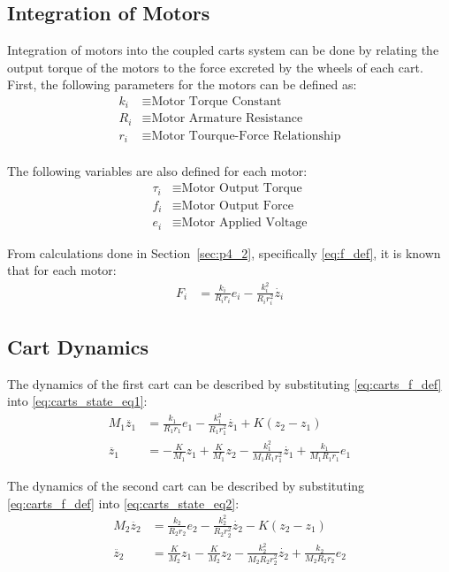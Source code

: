 \documentclass[]{article}
\newcommand{\sectionname}{Section}
\begin{document}
	\subsection{Integration of Motors}
		Integration of motors into the coupled carts system can be done by relating the output torque of the motors to the force excreted by the wheels of each cart.\\
		
		First, the following parameters for the motors can be defined as:
		\begin{align*}
			k_i &\equiv \text{Motor Torque Constant}\\
			R_i &\equiv \text{Motor Armature Resistance}\\
			r_i &\equiv \text{Motor Tourque-Force Relationship}\\
		\end{align*}
		
		The following variables are also defined for each motor:
		\begin{align*}
			\tau_i &\equiv \text{Motor Output Torque}\\
			f_i &\equiv \text{Motor Output Force}\\
			e_i &\equiv \text{Motor Applied Voltage}
		\end{align*}
		
		From calculations done in \sectionname \ \ref{sec:p4_2}, specifically \eqref{eq:f_def}, it is known that for each motor:
		\begin{align}
			F_i &= \frac{k_i}{R_i r_i} e_i - \frac{k_i^2}{R_i r_i^2} \dot{z_i} \label{eq:carts_f_def}
		\end{align}

		
	\subsection{Cart Dynamics}
		The dynamics of the first cart can be described by substituting \eqref{eq:carts_f_def} into \eqref{eq:carts_state_eq1}:
		\begin{align}
			M_1 \ddot{z_1} &= \frac{k_1}{R_1 r_1} e_1 - \frac{k_1^2}{R_1 r_1^2} \dot{z_1} + K(z_2 - z_1) \nonumber\\
			\ddot{z_1} &= -\frac{K}{M_1} z_1 + \frac{K}{M_1} z_2 - \frac{k_1^2}{M_1 R_1 r_1^2} \dot{z_1} + \frac{k_1}{M_1 R_1 r_1} e_1
		\end{align}
	
		The dynamics of the second cart can be described by substituting \eqref{eq:carts_f_def} into \eqref{eq:carts_state_eq2}:
		\begin{align}
			M_2 \ddot{z_2} &= \frac{k_2}{R_2 r_2} e_2 - \frac{k_2^2}{R_2 r_2^2} \dot{z_2} - K(z_2 - z_1) \nonumber\\
			\ddot{z_2} &= \frac{K}{M_2} z_1 - \frac{K}{M_2} z_2 - \frac{k_2^2}{M_2 R_2 r_2^2} \dot{z_2} + \frac{k_2}{M_2 R_2 r_2} e_2
		\end{align}
	
\end{document}
